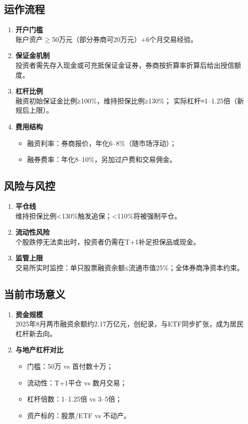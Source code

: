 \subsection{运作流程}
\begin{enumerate}[leftmargin=*, nosep]
    \item \textbf{开户门槛}  \\
    账户资产$\geq$50万元（部分券商可20万元）+6个月交易经验。
    \item \textbf{保证金机制}  \\
    投资者需先存入现金或可充抵保证金证券，券商按折算率折算后给出授信额度。
    \item \textbf{杠杆比例}  \\
    融资初始保证金比例≥100\%，维持担保比例≥130\%；  
    实际杠杆≈1–1.25倍（新规后上限）。
    \item \textbf{费用结构}  
    \begin{itemize}[nosep]
        \item 融资利率：券商报价，年化6–8\%（随市场浮动）；  
        \item 融券费率：年化8–10\%，另加过户费和交易佣金。
    \end{itemize}
\end{enumerate}

\subsection{风险与风控}
\begin{enumerate}[leftmargin=*, nosep]
    \item \textbf{平仓线}  \\
    维持担保比例<130\%触发追保；<110\%将被强制平仓。
    \item \textbf{流动性风险}  \\
    个股跌停无法卖出时，投资者仍需在T+1补足担保品或现金。
    \item \textbf{监管上限}  \\
    交易所实时监控：单只股票融资余额≤流通市值25\%；全体券商净资本约束。
\end{enumerate}

\subsection{当前市场意义}
\begin{enumerate}[leftmargin=*, nosep]
    \item \textbf{资金规模}  \\
    {\color{red}2025年8月两市融资余额约2.17万亿元，创纪录，与ETF同步扩张，成为居民杠杆新去向。}
    \item \textbf{与地产杠杆对比}  
    \begin{itemize}[nosep]
        \item 门槛：50万 vs 首付数十万；  
        \item 流动性：T+1平仓 vs 数月交易；  
        \item 杠杆倍数：1–1.25倍 vs 3–5倍；  
        \item 资产标的：股票/ETF vs 不动产。
    \end{itemize}
\end{enumerate}

